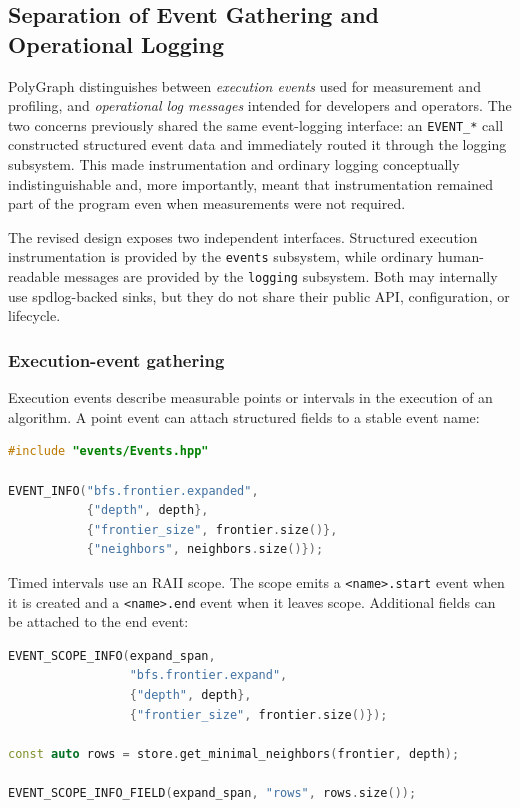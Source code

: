\subsection{Separation of Event Gathering and Operational Logging}
\label{subsec:event-gathering-logging}

PolyGraph distinguishes between \emph{execution events} used for measurement and
profiling, and \emph{operational log messages} intended for developers and
operators.  The two concerns previously shared the same event-logging interface:
an \texttt{EVENT\_*} call constructed structured event data and immediately routed
it through the logging subsystem.  This made instrumentation and ordinary logging
conceptually indistinguishable and, more importantly, meant that instrumentation
remained part of the program even when measurements were not required.

The revised design exposes two independent interfaces. Structured execution
instrumentation is provided by the \texttt{events} subsystem, while ordinary
human-readable messages are provided by the \texttt{logging} subsystem.  Both may
internally use spdlog-backed sinks, but they do not share their public API,
configuration, or lifecycle.

\subsubsection{Execution-event gathering}

Execution events describe measurable points or intervals in the execution of an
algorithm. A point event can attach structured fields to a stable event name:

\begin{lstlisting}[language=C++]
#include "events/Events.hpp"

EVENT_INFO("bfs.frontier.expanded",
           {"depth", depth},
           {"frontier_size", frontier.size()},
           {"neighbors", neighbors.size()});
\end{lstlisting}

Timed intervals use an RAII scope. The scope emits a
\texttt{<name>.start} event when it is created and a \texttt{<name>.end} event
when it leaves scope. Additional fields can be attached to the end event:

\begin{lstlisting}[language=C++]
EVENT_SCOPE_INFO(expand_span,
                 "bfs.frontier.expand",
                 {"depth", depth},
                 {"frontier_size", frontier.size()});

const auto rows = store.get_minimal_neighbors(frontier, depth);

EVENT_SCOPE_INFO_FIELD(expand_span, "rows", rows.size());
\end{lstlisting}

